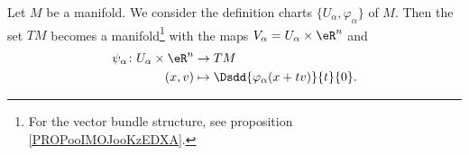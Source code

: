 \begin{theorem}     \label{THOooTSQXooLvJMQb}
	Let \( M\) be a manifold. We consider the definition charts \( \{ U_{\alpha}, \varphi_{\alpha} \}\) of \( M\). Then the set \( TM\) becomes a manifold\footnote{For the vector bundle structure, see proposition \ref{PROPooIMOJooKzEDXA}.} with the maps \( V_{\alpha}=U_{\alpha}\times \eR^n\) and
	\begin{equation}
		\begin{aligned}
			\psi_{\alpha}\colon U_{\alpha}\times \eR^n & \to TM                                         \\
			(x,v)                                      & \mapsto \Dsdd{ \varphi_{\alpha}(x+tv) }{t}{0}.
		\end{aligned}
	\end{equation}
\end{theorem}


